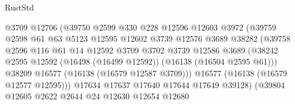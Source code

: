 \begin{lexlean}{RustStd}
\begin{coremodule}
                                    @3709
                                    @12706
                                    (@39750
                                      @2599
                                      @330
                                      @228
                                      @12596
                                      @12603
                                      @3972
                                      (@39759
                                        @2598
                                        @61
                                        @63
                                        @5123
                                        @12595
                                        @12602
                                        @3739
                                        @12576
                                        @3689
                                        @38282
                                        (@39758
                                          @2596
                                          @116
                                          @61
                                          @14
                                          @12592
                                          @3709
                                          @3702
                                          @3739
                                          @12586
                                          @3689
                                          (@38242
                                            @2595
                                            @12592
                                            (@16498 (@16499 @12592))
                                            (@16138 (@16504 @2595 @61)))
                                          @38209
                                          @16577
                                          (@16138 (@16579 @12587 @3709)))
                                        @16577
                                        (@16138 (@16579 @12577 @12595)))
                                      @17634
                                      @17637
                                      @17640
                                      @17644
                                      @17649
                                      @39128)
                                    (@39804
                                      @12605
                                      @2622
                                      @2644
                                      @24
                                      @12630
                                      @12654
                                      @12680

\end{coremodule}
\end{lexlean}
